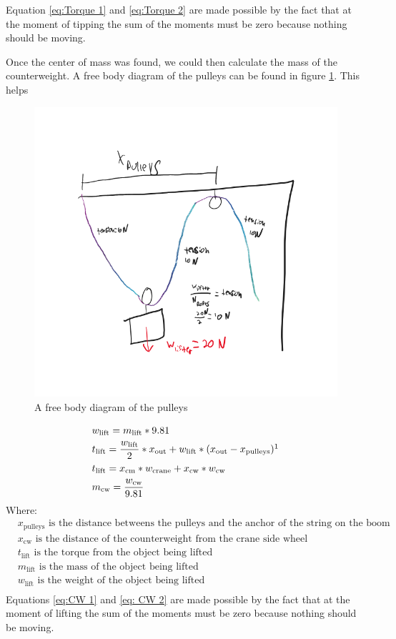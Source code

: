\documentclass[letterpaper, 12pt]{article}
\begin{document}
Equation \ref{eq:Torque 1} and \ref{eq:Torque 2} are made possible by the fact that at the moment of tipping the sum of the moments must be zero because nothing should be moving. 

Once the center of mass was found, we could then calculate the mass of the counterweight. A free body diagram of the pulleys can be found in figure \ref{fig:Pulleys}. This helps 
\begin{figure}
    \centering
    \includegraphics[width =0.6\linewidth]{null (2).png}
    \caption{A free body diagram of the pulleys}
    \label{fig:Pulleys}
\end{figure}

\begin{align}
& w_{\text{lift}}=m_{\text{lift}}*9.81 \\
& t_{\text{lift}}= \frac{w_\text{lift}}{2}*x_{\text{out}}+ w_{\text{lift}}*(x_\text{out}-x_{\text{pulleys}}) \footnotemark \label{eq:CW 1} \\ 
& t_{\text{lift}} = x_{\text{cm}} * w_{\text{crane}} + x_{\text{cw}} * w_{\text{cw}} \label{eq: CW 2} \\
& m_{\text{cw}} = \frac{w_{\text{cw}}}{9.81}
\end{align}
Where:
\begin{equation}
 \begin{split}
    & x_{\text{pulleys}}  \text{ is the distance betweens the pulleys and the anchor of the string on the boom } \\
    & x_{\text{cw}}  \text{ is the distance of the counterweight from the crane side wheel} \\
    & t_{\text{lift}} \text{ is the torque from the object being lifted} \\
    & m_{\text{lift}} \text{ is the mass of the object being lifted} \\
    & w_{\text{lift}} \text{ is the weight of the object being lifted} \\
 \end{split}
\end{equation}
Equations \ref{eq:CW 1} and \ref{eq: CW 2} are made possible by the fact that at the moment of lifting the sum of the moments must be zero because nothing should be moving.
\end{document}
